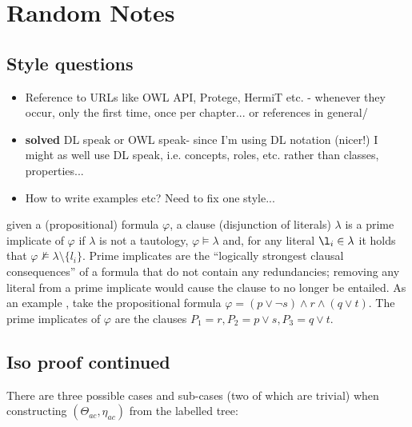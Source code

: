 \chapter{Random Notes}

\listoftodos

\section*{Style questions}
\begin{itemize}
\item Reference to URLs like OWL API, Protege, HermiT etc. - whenever they occur, only the first time, once per chapter... or references in general/
\item \textbf{solved} DL speak or OWL speak- since I'm using DL notation (nicer!) I might as well use DL speak, i.e. concepts, roles, etc. rather than classes, properties...
\item How to write examples etc? Need to fix one style...
\end{itemize}


 given a (propositional) formula $\varphi$, a clause (disjunction of literals) $\lambda$ is a prime implicate of $\varphi$ if $\lambda$ is not a tautology, $\varphi \models \lambda$ and, for any literal $\l_{i} \in \lambda$ it holds that  $\varphi \not \models \lambda \setminus \{ l_{i}\}$. Prime implicates are the \enquote{logically strongest clausal consequences} \cite{bienvenu09aa} of a formula that do not contain any redundancies; removing any literal from a prime implicate would cause the clause to no longer be entailed. As an example \cite{horridge11ab}, take the propositional formula $\varphi = (p \vee \neg s) \wedge r \wedge (q \vee t)$. The prime implicates of $\varphi$ are the clauses $P_{1} = r, P_{2} = p \vee s, P_{3} = q \vee t.$
 
 

\section*{Iso proof continued}

There are three possible cases and sub-cases (two of which are trivial) when constructing $(\Theta_{ac}, \eta_{ac})$ from the labelled tree: 

